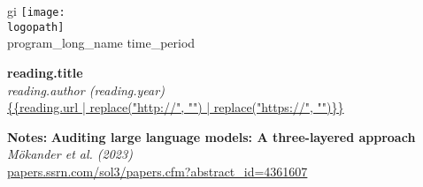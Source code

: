 \documentclass[12pt]{article}
\def\logopath{../assets/caiac_logo.png}  %
\def\programlongname{
    {{ program_long_name }}
}
\def\timeperiod{
    {{ time_period }}
}
\begin{document}
\thispagestyle{empty} %

\begin{center}gi
    \texttt{[image: \\logopath]}\\
    \vspace{0.2em}
    {\color{primaryFaded}\programlongname\color{primaryFaded}\timeperiod}
\end{center}

\vspace{1em}

\noindent\textbf{ {{reading.title}} }\\
\textit{ {{reading.author}} ({{reading.year}}) }\\
{\small \url{ {{reading.url | replace("http://", "") | replace("https://", "")}} }}

\vspace{1em}
\textbf{Notes:}
\noindent\textbf{ Auditing large language models: A three-layered approach }\\
\textit{ Mökander et al. (2023) }\\
{\small \url{ papers.ssrn.com/sol3/papers.cfm?abstract_id=4361607 }}

\vspace{4em}
\end{document}
